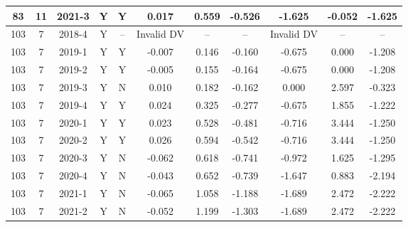 \begin{landscape}
\begin{longtable}{@{}ccccc|ccc|ccc@{}}
83 & 11 & 2021-3 & Y & Y & 0.017 & 0.559 & -0.526 & -1.625 & -0.052 & -1.625 \\* \midrule
103 & 7 & 2018-4 & Y & -- & Invalid DV & -- & -- & Invalid DV & -- & -- \\* \midrule
103 & 7 & 2019-1 & Y & Y & -0.007 & 0.146 & -0.160 & -0.675 & 0.000 & -1.208 \\* \midrule
103 & 7 & 2019-2 & Y & Y & -0.005 & 0.155 & -0.164 & -0.675 & 0.000 & -1.208 \\* \midrule
103 & 7 & 2019-3 & Y & N & 0.010 & 0.182 & -0.162 & 0.000 & 2.597 & -0.323 \\* \midrule
103 & 7 & 2019-4 & Y & Y & 0.024 & 0.325 & -0.277 & -0.675 & 1.855 & -1.222 \\* \midrule
103 & 7 & 2020-1 & Y & Y & 0.023 & 0.528 & -0.481 & -0.716 & 3.444 & -1.250 \\* \midrule
103 & 7 & 2020-2 & Y & Y & 0.026 & 0.594 & -0.542 & -0.716 & 3.444 & -1.250 \\* \midrule
103 & 7 & 2020-3 & Y & N & -0.062 & 0.618 & -0.741 & -0.972 & 1.625 & -1.295 \\* \midrule
103 & 7 & 2020-4 & Y & N & -0.043 & 0.652 & -0.739 & -1.647 & 0.883 & -2.194 \\* \midrule
103 & 7 & 2021-1 & Y & N & -0.065 & 1.058 & -1.188 & -1.689 & 2.472 & -2.222 \\* \midrule
103 & 7 & 2021-2 & Y & N & -0.052 & 1.199 & -1.303 & -1.689 & 2.472 & -2.222 \\* \bottomrule
\end{longtable}
\end{landscape}